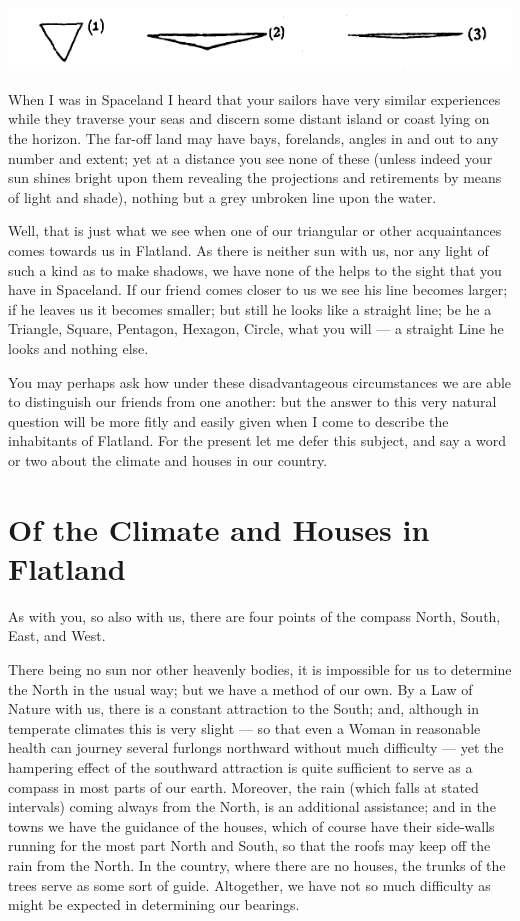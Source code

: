 \documentclass[10pt, kindle, oneside]{kindle}
\begin{document}
\includegraphics[trim=0mm 0mm 0mm 0mm,width=\linewidth]{fig1}

When I was in Spaceland I heard that your sailors have very similar
experiences while they traverse your seas and discern some distant island or
coast lying on the horizon. The far-off land may have bays, forelands, angles
in and out to any number and extent; yet at a distance you see none of these
(unless indeed your sun shines bright upon them revealing the projections and
retirements by means of light and shade), nothing but a grey unbroken line
upon the water.

Well, that is just what we see when one of our triangular or other
acquaintances comes towards us in Flatland. As there is neither sun with us,
nor any light of such a kind as to make shadows, we have none of the helps to
the sight that you have in Spaceland. If our friend comes closer to us we see
his line becomes larger; if he leaves us it becomes smaller; but still he
looks like a straight line; be he a Triangle, Square, Pentagon, Hexagon,
Circle, what you will --- a straight Line he looks and nothing else.

You may perhaps ask how under these disadvantageous circumstances we are able
to distinguish our friends from one another: but the answer to this very
natural question will be more fitly and easily given when I come to describe
the inhabitants of Flatland. For the present let me defer this subject, and
say a word or two about the climate and houses in our country.


\chapter{Of the Climate and Houses in Flatland}


As with you, so also with us, there are four points of the compass North,
South, East, and West.

There being no sun nor other heavenly bodies,
it is impossible for us to determine the North in the usual way; but we have a
method of our own. By a Law of Nature with us, there is a constant attraction
to the South; and, although in temperate climates this is very slight --- so
that even a Woman in reasonable health can journey several furlongs northward
without much difficulty --- yet the hampering effect of the southward attraction
is quite sufficient to serve as a compass in most parts of our earth.
Moreover, the rain (which falls at stated intervals) coming always from the
North, is an additional assistance; and in the towns we have the guidance of
the houses, which of course have their side-walls running for the most part
North and South, so that the roofs may keep off the rain from the North. In
the country, where there are no houses, the trunks of the trees serve as some
sort of guide. Altogether, we have not so much difficulty as might be expected
in determining our bearings.
\end{document}
